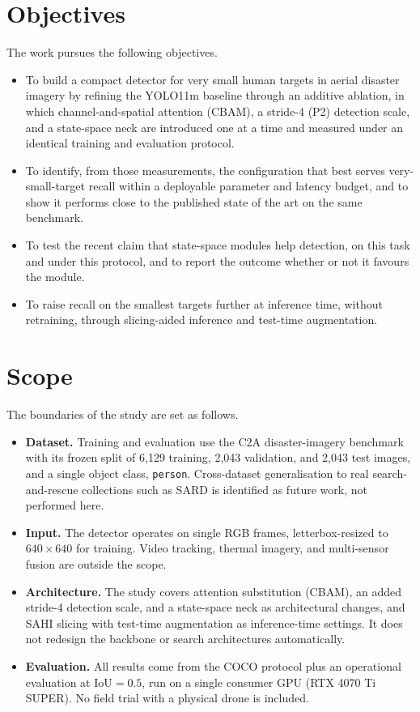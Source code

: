 \section{Objectives}
The work pursues the following objectives.
\begin{itemize}
  \item To build a compact detector for very small human targets in aerial
        disaster imagery by refining the YOLO11m baseline through an additive
        ablation, in which channel-and-spatial attention (CBAM), a stride-4
        (P2) detection scale, and a state-space neck are introduced one at a
        time and measured under an identical training and evaluation protocol.
  \item To identify, from those measurements, the configuration that best
        serves very-small-target recall within a deployable parameter and
        latency budget, and to show it performs close to the published state
        of the art on the same benchmark.
  \item To test the recent claim that state-space modules help detection, on
        this task and under this protocol, and to report the outcome whether
        or not it favours the module.
  \item To raise recall on the smallest targets further at inference time,
        without retraining, through slicing-aided inference and test-time
        augmentation.
\end{itemize}

\section{Scope}
The boundaries of the study are set as follows.
\begin{itemize}
  \item \textbf{Dataset.} Training and evaluation use the C2A disaster-imagery
        benchmark~\cite{nihal2024c2a} with its frozen split of 6{,}129
        training, 2{,}043 validation, and 2{,}043 test images, and a single
        object class, \texttt{person}. Cross-dataset generalisation to real
        search-and-rescue collections such as SARD is identified as future
        work, not performed here.
  \item \textbf{Input.} The detector operates on single RGB frames,
        letterbox-resized to $640 \times 640$ for training. Video tracking,
        thermal imagery, and multi-sensor fusion are outside the scope.
  \item \textbf{Architecture.} The study covers attention substitution
        (CBAM), an added stride-4 detection scale, and a state-space neck as
        architectural changes, and SAHI slicing with test-time augmentation as
        inference-time settings. It does not redesign the backbone or search
        architectures automatically.
  \item \textbf{Evaluation.} All results come from the COCO protocol plus an
        operational evaluation at $\mathrm{IoU} = 0.5$, run on a single
        consumer GPU (RTX 4070 Ti SUPER). No field trial with a physical
        drone is included.
\end{itemize}

